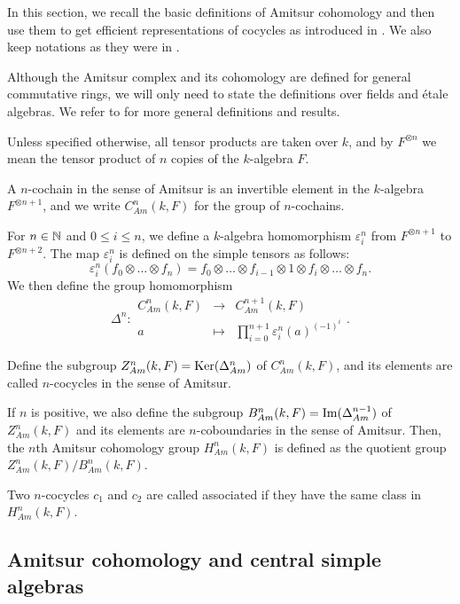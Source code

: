 In this section, we recall the basic definitions of Amitsur cohomology and then use them to get efficient representations of cocycles as introduced in . We also keep notations as they were in .

Although the Amitsur complex and its cohomology are defined for general commutative rings, we will only need to state the definitions over fields and étale algebras. We refer to \cite[Chapter 5]{ford2017separable} for more general definitions and results.

Unless specified otherwise, all tensor products are taken over \(k\), and by \(F^{\otimes n}\) we mean the tensor product of \(n\) copies of the \(k\)-algebra \(F\).

\begin{definition}
    A \(n\)-cochain in the sense of Amitsur is an invertible element in the \(k\)-algebra \(F^{\otimes n+1}\), and we write \(C_{Am}^n(k,F)\) for the group of \(n\)-cochains. 

    For \(n \in \mathbb{N}\) and \(0 \leq i \leq n\), we define a \(k\)-algebra homomorphism \(\varepsilon_i^n\) from \(F^{\otimes n+1}\) to \(F^{\otimes n+2}\). The map \(\varepsilon_i^n\) is defined on the simple tensors as follows:
    \[\varepsilon_i^n(f_0 \otimes \hdots \otimes f_n) = f_0 \otimes \hdots \otimes f_{i-1} \otimes 1 \otimes f_{i} \otimes \hdots \otimes f_n.\]
    We then define the group homomorphism
    \[\Delta^n\colon\begin{array}{ccl} C_{Am}^n(k,F) &\to &C_{Am}^{n+1}(k,F) \\ a &\mapsto &\prod_{i=0}^{n+1} \varepsilon_i^n(a)^{(-1)^i}\end{array}.\]

    Define the subgroup \(Z_{Am}^n(k,F) = \operatorname{Ker}(\Delta_{Am}^n)\) of \(C_{Am}^n(k,F)\), and its elements are called \(n\)-cocycles in the sense of Amitsur.

    If \(n\) is positive, we also define the subgroup \(B_{Am}^n(k,F) = \operatorname{Im}(\Delta_{Am}^{n-1})\) of \(Z_{Am}^n(k,F)\) and its elements are \(n\)-coboundaries in the sense of Amitsur. Then, the \(n\)th Amitsur cohomology group \(H_{Am}^n(k,F)\) is defined as the quotient group \(Z_{Am}^n(k,F)/B_{Am}^n(k,F)\).

    Two \(n\)-cocycles \(c_1\) and \(c_2\) are called associated if they have the same class in \(H_{Am}^n(k,F)\).
\end{definition}

\subsection{Amitsur cohomology and central simple algebras}\label{Sec:AmitsurAlgebra}

